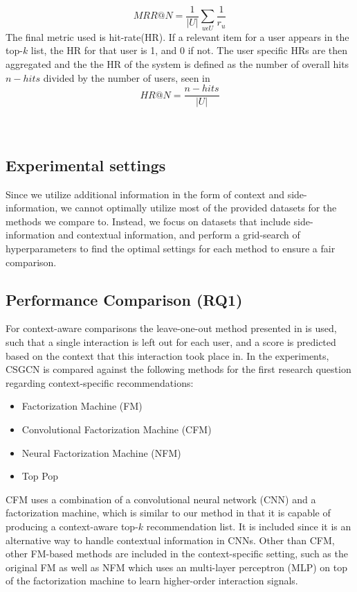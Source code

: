\begin{equation}
    \label{eqn:mrr}
    MRR@N = \frac{1}{|U|} \sum\limits_{u \epsilon U}\frac{1}{r_u}
\end{equation}
The final metric used is hit-rate(HR).
If a relevant item for a user appears in the top-$k$ list, the HR for that user is 1, and 0 if not. The user specific HRs are then aggregated and the the HR of the system is defined as the number of overall hits $n-hits$ divided by the number of users, seen in  
\begin{equation}
    \label{eqn:hr}
    HR@N = \frac{n-hits}{|U|}
\end{equation}
\\\\

\subsection{Experimental settings}
Since we utilize additional information in the form of context and side-information, we cannot optimally utilize most of the provided datasets for the methods we compare to.
Instead, we focus on datasets that include side-information and contextual information, and perform a grid-search of hyperparameters to find the optimal settings for each method to ensure a fair comparison.

\subsection{Performance Comparison (RQ1)}
For context-aware comparisons the leave-one-out method presented in  is used, such that a single interaction is left out for each user, and a score is predicted based on the context that this interaction took place in.
In the experiments, CSGCN is compared against the following methods for the first research question regarding context-specific recommendations:
\begin{itemize}
    \item Factorization Machine (FM)\cite{fmrendle}
    \item Convolutional Factorization Machine (CFM) \cite{CFM}
    \item Neural Factorization Machine (NFM) \cite{NeuralFM}
    \item Top Pop
\end{itemize}
CFM uses a combination of a convolutional neural network (CNN) and a factorization machine, which is similar to our method in that it is capable of producing a context-aware top-$k$ recommendation list.
It is included since it is an alternative way to handle contextual information in CNNs.
Other than CFM, other FM-based methods are included in the context-specific setting, such as the original FM as well as NFM which uses an multi-layer perceptron (MLP) on top of the factorization machine to learn higher-order interaction signals.

